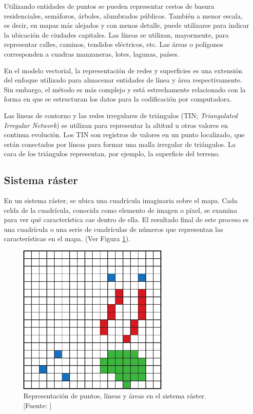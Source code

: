Utilizando entidades de puntos se pueden representar cestos de basura residenciales, semáforos, árboles, alumbrados públicos. También a menor escala, es decir, en mapas más alejados y con menos detalle, puede utilizarse para indicar la ubicación de ciudades capitales. Las líneas se utilizan, mayormente, para representar calles, caminos, tendidos eléctricos, etc. Las áreas o polígonos corresponden a cuadras manzaneras, lotes, lagunas, países.

En el modelo vectorial, la representación de redes y superficies es una extensión del enfoque utilizado para almacenar entidades de línea y área respectivamente. Sin embargo, el método es más complejo y está estrechamente relacionado con la forma en que se estructuran los datos para la codificación por computadora.

Las líneas de contorno y las redes irregulares de triángulos (TIN; \textit{Triangulated Irregular Network}) se utilizan para representar la altitud u otros valores en continua evolución. Los TIN son registros de valores en un punto localizado, que están conectados por líneas para formar una malla irregular de triángulos. La cara de los triángulos representan, por ejemplo, la superficie del terreno.

\subsection{Sistema ráster}

En un sistema ráster, se ubica una cuadrícula imaginaria sobre el mapa. Cada celda de la cuadrícula, conocida como elemento de imagen o píxel, se examina para ver qué característica cae dentro de ella. El resultado final de este proceso es una cuadrícula o una serie de cuadrículas de números que representan las características en el mapa. (Ver Figura \ref{fig:modeloRaster}).

\begin{figure}[H]
    \centering
    \includegraphics[width=7.5cm]{modeloRaster.png}
    \caption{Representación de puntos, líneas y áreas en el sistema ráster. [Fuente: \citet{Heywood2006AnSystems}]}
    \label{fig:modeloRaster}
\end{figure}

